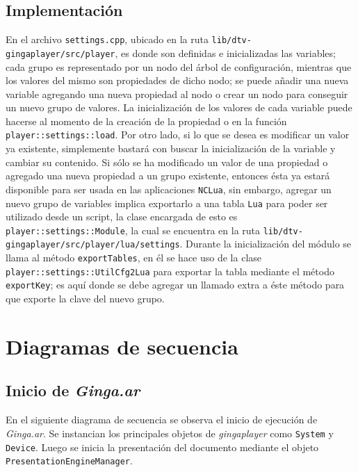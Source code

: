 \subsection{Implementación}
En el archivo \texttt{settings.cpp}, ubicado en la ruta \texttt{lib/dtv-gingaplayer/src/player}, es donde son definidas e inicializadas las variables; cada grupo es representado por un nodo del árbol de configuración, mientras que los valores del mismo son propiedades de dicho nodo; se puede añadir una nueva variable agregando una nueva propiedad al nodo o crear un nodo para conseguir un nuevo grupo de valores. La inicialización de los valores de cada variable puede hacerse al momento de la creación de la propiedad o en la función \texttt{player::settings::load}. Por otro lado, si lo que se desea es modificar un valor ya existente, simplemente bastará con buscar la inicialización de la variable y cambiar su contenido. 
Si sólo se ha modificado un valor de una propiedad o agregado una nueva propiedad a un grupo existente, entonces ésta ya estará disponible para ser usada en las aplicaciones \texttt{NCLua}, sin embargo, agregar un nuevo grupo de variables implica exportarlo a una tabla \texttt{Lua} para poder ser utilizado desde un script, la clase encargada de esto es \texttt{player::settings::Module}, la cual se encuentra en la ruta \texttt{lib/dtv-gingaplayer/src/player/lua/settings}. Durante la inicialización del módulo se llama al método \texttt{exportTables}, en él se hace uso de la clase \texttt{player::settings::UtilCfg2Lua} para exportar la tabla mediante el método \texttt{exportKey}; es aquí donde se debe agregar un llamado extra a éste método para que exporte la clave del nuevo grupo.


\section{Diagramas de secuencia}

\subsection{Inicio de \textit{Ginga.ar}}
En el siguiente diagrama de secuencia se observa el inicio de ejecución de \textit{Ginga.ar}. 
Se instancian los principales objetos de \textit{gingaplayer} como \texttt{System} y \texttt{Device}. 
Luego se inicia la presentación del documento mediante el objeto \texttt{PresentationEngineManager}.

